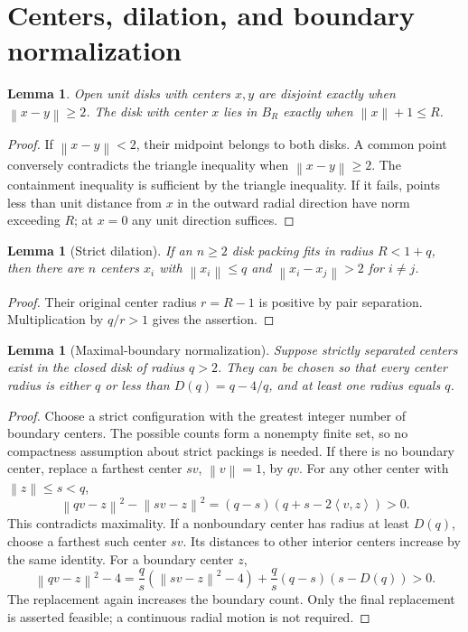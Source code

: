 \documentclass[11pt]{amsart}
\newtheorem{lemma}[theorem]{Lemma}
\theoremstyle{definition}
\theoremstyle{remark}
\newcommand{\norm}[1]{\left\lVert #1\right\rVert}
\newcommand{\ip}[2]{\left\langle #1,#2\right\rangle}
\begin{document}
\section{Centers, dilation, and boundary normalization}\label{sec:normalization}
\begin{lemma}\label{lem:centers}
Open unit disks with centers $x,y$ are disjoint exactly when $\norm{x-y}\ge2$.
The disk with center $x$ lies in $B_R$ exactly when $\norm{x}+1\le R$.
\end{lemma}
\begin{proof}
If $\norm{x-y}<2$, their midpoint belongs to both disks. A common point
conversely contradicts the triangle inequality when $\norm{x-y}\ge2$.
The containment inequality is sufficient by the triangle inequality. If it
fails, points less than unit distance from $x$ in the outward radial direction
have norm exceeding $R$; at $x=0$ any unit direction suffices.
\end{proof}

\begin{lemma}[Strict dilation]\label{lem:strict}
If an $n\ge2$ disk packing fits in radius $R<1+q$, then there are $n$ centers
$x_i$ with $\norm{x_i}\le q$ and $\norm{x_i-x_j}>2$ for $i\ne j$.
\end{lemma}
\begin{proof}
Their original center radius $r=R-1$ is positive by pair separation.
Multiplication by $q/r>1$ gives the assertion.
\end{proof}

\begin{lemma}[Maximal-boundary normalization]\label{lem:push}
Suppose strictly separated centers exist in the closed disk of radius $q>2$.
They can be chosen so that every center radius is either $q$ or less than
$D(q)=q-4/q$, and at least one radius equals $q$.
\end{lemma}
\begin{proof}
Choose a strict configuration with the greatest integer number of boundary
centers. The possible counts form a nonempty finite set, so no compactness
assumption about strict packings is needed. If there is no boundary center,
replace a farthest center $sv$, $\norm v=1$, by $qv$. For any other center
with $\norm z\le s<q$,
\[
\norm{qv-z}^2-\norm{sv-z}^2
 =(q-s)(q+s-2\ip vz)>0.
\]
This contradicts maximality. If a nonboundary center has radius at least
$D(q)$, choose a farthest such center $sv$. Its distances to other interior
centers increase by the same identity. For a boundary center $z$,
\[
\norm{qv-z}^2-4
 =\frac qs(\norm{sv-z}^2-4)
  +\frac qs(q-s)(s-D(q))>0.
\]
The replacement again increases the boundary count. Only the final
replacement is asserted feasible; a continuous radial motion is not required.
\end{proof}
\end{document}
